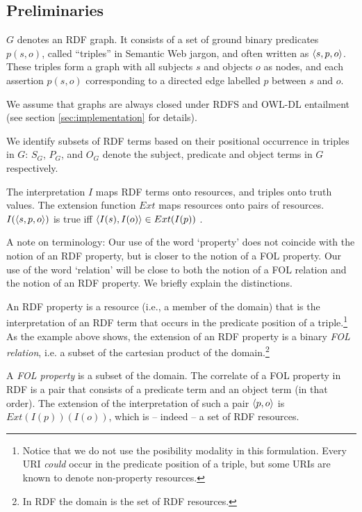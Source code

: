 \subsection{Preliminaries}
\label{sec:preliminaries}


$G$ denotes an RDF graph. It consists of a set of ground binary
predicates $p(s,o)$, called ``triples'' in Semantic Web jargon, and often
written as $\langle s,p,o\rangle$. These triples form a graph with all
subjects $s$ and objects $o$ as nodes, and 
each assertion $p(s,o)$ corresponding to a directed edge labelled $p$
between $s$ and $o$. 

We assume that graphs are always closed under
  RDFS and OWL-DL entailment
  (see section \ref{sec:implementation} for details).

We identify subsets of RDF terms based on
  their positional occurrence in triples in $G$:
  $S_G$, $P_G$, and $O_G$ denote the subject, predicate and object terms
  in $G$ respectively.

The interpretation $I$ maps RDF terms onto resources,
  and triples onto truth values.
The extension function $Ext$ maps resources onto pairs of resources.
$I(\langle s,p,o\rangle)$ is true iff
  $\langle I(s),I(o)\rangle \in Ext(I(p))$ \cite{Hayes2004}.

A note on terminology: Our use of the word `property' does not coincide
  with the notion of an RDF property, but is closer to the notion
  of a FOL property. Our use of the word `relation' will be close to
  both the notion of a FOL relation and the notion of an RDF property.
  We briefly explain the distinctions.

An RDF property is a resource (i.e., a member of the domain)
  that is the interpretation of
  an RDF term that occurs in the predicate position of a triple.\footnote{
    Notice that we do not use the posibility modality in this formulation.
    Every URI \emph{could} occur in the predicate position of a triple,
      but some URIs are known to denote non-property resources.
  }
As the example above shows, the extension of an RDF property is
  a binary \emph{FOL relation},
  i.e. a subset of the cartesian product of the domain.\footnote{
    In RDF the domain is the set of RDF resources.}

A \emph{FOL property} is a subset of the domain.
The correlate of a FOL property in RDF is a pair that consists of
  a predicate term and an object term (in that order).
The extension of the interpretation of such a pair $\langle p,o\rangle$
  is $Ext(I(p))(I(o))$, which is -- indeed -- a set of RDF resources.

